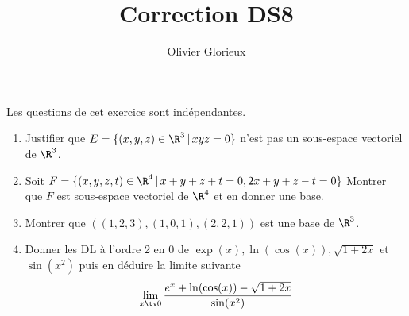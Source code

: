 \documentclass[a4paper, 11pt,reqno]{article}
\author{Olivier Glorieux}
\begin{document}
\title{ Correction DS8}



\begin{exercice}
Les questions de cet exercice sont indépendantes. 
\begin{enumerate}
\item Justifier que $E=\{(x,y,z) \in \R^3\, |\, xyz=0\}$ n'est pas un sous-espace vectoriel de $\R^3$.
\item Soit $F=\{ (x,y,z,t)\in \R^4 \, |\, x+y+z+t=0, 2x+y+z-t=0\}$
Montrer que $F$ est sous-espace vectoriel de $\R^4$ et en donner une base. 

\item Montrer que $((1,2,3),(1,0,1), (2,2,1))$ est une base de $\R^3$.

\item Donner les DL à l'ordre 2 en  0 de $\exp(x),\ln(\cos(x)),\sqrt{1+2x}$ et $\sin(x^2)$ puis  en déduire la limite suivante 
$$\lim_{x\tv 0} \frac{e^x+\ln(\cos(x))-\sqrt{1+2x}}{\sin(x^2)}$$

\end{enumerate}

\end{exercice}
\end{document}
